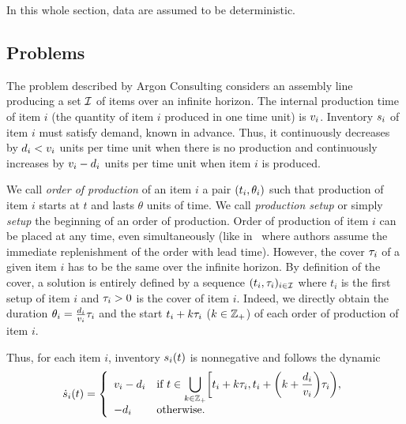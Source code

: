 In this whole section, data are assumed to be deterministic.


\subsection{Problems}
\label{sec:lot-size:single-line:deterministic:problems}

The problem described by Argon Consulting considers an assembly line producing a set $\mathcal{I}$ of items over an infinite horizon.
The internal production time of item $i$ (\ie the quantity of item $i$ produced in one time unit) is $v_i$.
Inventory $s_i$ of item $i$ must satisfy demand, known in advance.
Thus, it continuously decreases by $d_i<v_i$ units per time unit when there is no production and continuously increases by $v_i-d_i$ units per time unit when item $i$ is produced.


We call \emph{order of production} of an item $i$ a pair $\bracket{t_i,\theta_i}$ such that production of item $i$ starts at $t$ and lasts $\theta$ units of time.
We call \emph{production setup} or simply \emph{setup} the beginning of an order of production.
Order of production of item $i$ can be placed at any time, even simultaneously (like in~\cite{Ohno2001} where authors assume the immediate replenishment of the order with lead time).
However, the cover $\tau_i$ of a given item $i$ has to be the same over the infinite horizon.
By definition of the cover, a solution is entirely defined by a sequence $\bracket{t_i,\cover_i}_{i\in\REF}$ where $t_i$ is the first setup of item $i$ and $\tau_i>0$ is the cover of item $i$.
Indeed, we directly obtain the duration $\theta_i=\frac{d_i}{v_i}\tau_i$ and the start $t_i+k\tau_i$ ($k\in\mathbb{Z}_+$) of each order of production of item $i$.

Thus, for each item $i$, inventory $\inventory_i\bracket{t}$ is nonnegative and follows the dynamic
\begin{equation}\label{eq:lot-size:single-line:deterministic:motivations:dynamic}
  \dot{\inventory}_i\bracket{t} =
  \left\{
  \begin{array}{ll}
  \rate_i-\demand_i
  & \ds\mbox{if}\ t\in\bigcup_{k\in\ZZ_+} \left[t_i+k\cover_i,t_i+\bracket{k+\frac{\demand_i}{\rate_i}}\cover_i\right),
  \\
  -\demand_i
  & \mbox{otherwise}.
  \end{array}
  \right.
\end{equation}

